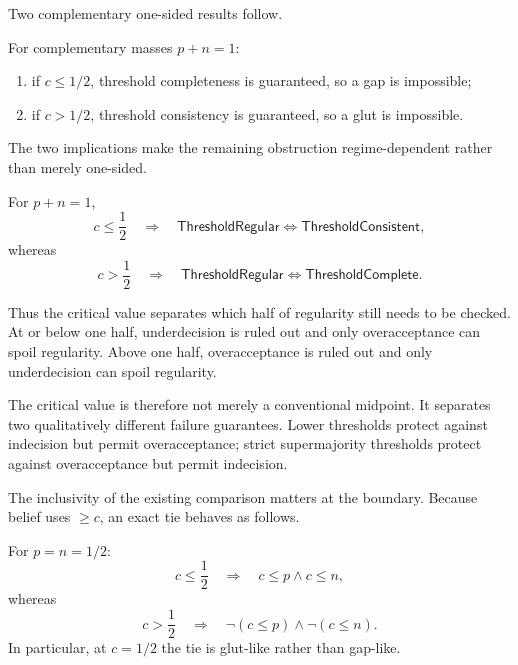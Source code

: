 Two complementary one-sided results follow.

\begin{theorem}
\label{thm:threshold-phase-boundary}
For complementary masses \(p+n=1\):
\begin{enumerate}[label=(\roman*)]
  \item if \(c\le 1/2\), threshold completeness is guaranteed, so a gap is
        impossible;
  \item if \(c>1/2\), threshold consistency is guaranteed, so a glut is
        impossible.
\end{enumerate}
\statusverified
\end{theorem}

The two implications make the remaining obstruction regime-dependent rather than
merely one-sided.

\begin{corollary}
\label{cor:threshold-regime-reduction}
For \(p+n=1\),
\[
  c\le\frac12
  \quad\Longrightarrow\quad
  \mathsf{ThresholdRegular}
  \Longleftrightarrow
  \mathsf{ThresholdConsistent},
\]
whereas
\[
  c>\frac12
  \quad\Longrightarrow\quad
  \mathsf{ThresholdRegular}
  \Longleftrightarrow
  \mathsf{ThresholdComplete}.
\]
\statusverified
\end{corollary}

Thus the critical value separates which half of regularity still needs to be checked.
At or below one half, underdecision is ruled out and only overacceptance can spoil
regularity.  Above one half, overacceptance is ruled out and only underdecision can
spoil regularity.

The critical value is therefore not merely a conventional midpoint.  It separates
two qualitatively different failure guarantees.  Lower thresholds protect against
indecision but permit overacceptance; strict supermajority thresholds protect
against overacceptance but permit indecision.

The inclusivity of the existing comparison matters at the boundary.  Because belief
uses \(\ge c\), an exact tie behaves as follows.

\begin{theorem}
\label{thm:half-half-phase-dichotomy}
For \(p=n=1/2\):
\[
  c\le\frac12
  \quad\Longrightarrow\quad
  c\le p\land c\le n,
\]
whereas
\[
  c>\frac12
  \quad\Longrightarrow\quad
  \neg(c\le p)\land\neg(c\le n).
\]
In particular, at \(c=1/2\) the tie is glut-like rather than gap-like.
\statusverified
\end{theorem}

